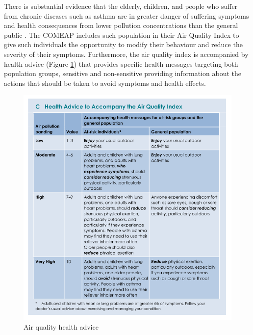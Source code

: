 There is substantial evidence that the elderly, children, and people who suffer from chronic diseases such as asthma are in greater danger of suffering symptoms and health consequences from lower pollution concentrations than the general public \cite{Koenig1999} \cite{Kampa2008} \cite{Zones2010}. The COMEAP includes such population in their Air Quality Index to give such individuals the opportunity to modify their behaviour and reduce the severity of their symptoms. Furthermore, the air quality index is accompanied by health advice (Figure \ref{fig:air_quality_health_advice}) that provides specific health messages targeting both population groups, sensitive and non-sensitive providing information about the actions that should be taken to avoid symptoms and health effects.

\begin{figure}[H]
\begin{adjustbox}{width=1\textwidth,center=\textwidth}
  \centering
  \includegraphics[scale=.8]{images/air_quality_health_advice.png}
\end{adjustbox}
  \caption[Air quality health advice]{Air quality health advice \cite{HealthProtectionAgencyfortheCommitteeontheMedicalEffectsofAirPollutants2011}}
  \label{fig:air_quality_health_advice}
\end{figure}



